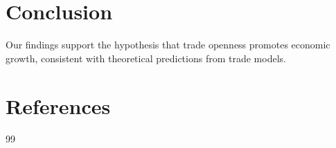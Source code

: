 \documentclass{aer}
\begin{document}
\section{Conclusion}

Our findings support the hypothesis that trade openness promotes economic growth,
consistent with theoretical predictions from trade models.

\section*{References}

\begin{thebibliography}{99}
\addtolength{\itemsep}{-0.5ex}


\end{thebibliography}
\end{document}

